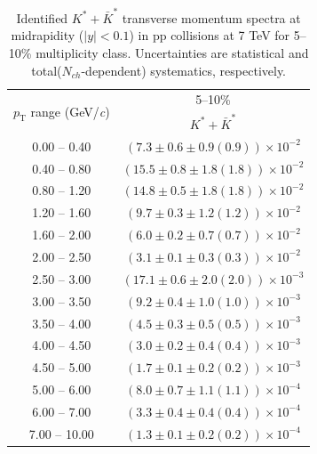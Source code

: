 \begin{table}
\caption{Identified $K^{*} + \bar{K}^{*}$ transverse momentum spectra at midrapidity ($|y|<0.1$) in pp collisions at 7 TeV for 5--10\% multiplicity class. Uncertainties are statistical and total($N_{ch}$-dependent) systematics, respectively.}
\label{tab:KStar_5to10}
\begin{center}
\begin{tabular}{ c | c }
\hline
\multirow{2}{*}{$p_{\mathrm{T}}$ range (GeV/\textit{c})} & \multicolumn{1}{c}{5--10\%} \\ & $K^{*} + \bar{K}^{*}$\\ 
\hline
0.00 -- 0.40 & $(7.3\pm0.6\pm0.9(0.9))\times10^{-2}$ \\ 
0.40 -- 0.80 & $(15.5\pm0.8\pm1.8(1.8))\times10^{-2}$ \\ 
0.80 -- 1.20 & $(14.8\pm0.5\pm1.8(1.8))\times10^{-2}$ \\ 
1.20 -- 1.60 & $(9.7\pm0.3\pm1.2(1.2))\times10^{-2}$ \\ 
1.60 -- 2.00 & $(6.0\pm0.2\pm0.7(0.7))\times10^{-2}$ \\ 
2.00 -- 2.50 & $(3.1\pm0.1\pm0.3(0.3))\times10^{-2}$ \\ 
2.50 -- 3.00 & $(17.1\pm0.6\pm2.0(2.0))\times10^{-3}$ \\ 
3.00 -- 3.50 & $(9.2\pm0.4\pm1.0(1.0))\times10^{-3}$ \\ 
3.50 -- 4.00 & $(4.5\pm0.3\pm0.5(0.5))\times10^{-3}$ \\ 
4.00 -- 4.50 & $(3.0\pm0.2\pm0.4(0.4))\times10^{-3}$ \\ 
4.50 -- 5.00 & $(1.7\pm0.1\pm0.2(0.2))\times10^{-3}$ \\ 
5.00 -- 6.00 & $(8.0\pm0.7\pm1.1(1.1))\times10^{-4}$ \\ 
6.00 -- 7.00 & $(3.3\pm0.4\pm0.4(0.4))\times10^{-4}$ \\ 
7.00 -- 10.00 & $(1.3\pm0.1\pm0.2(0.2))\times10^{-4}$ \\ 
\hline
\end{tabular}
\end{center}
\end{table}
 
